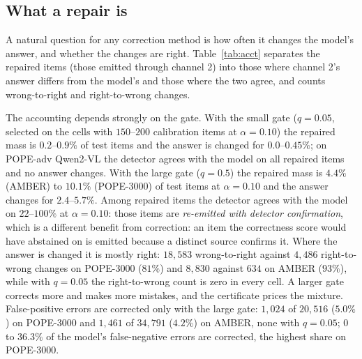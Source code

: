 \subsection{What a repair is}
\label{sec:accounting}

A natural question for any correction method is how often it changes the model's answer, and whether
the changes are right. Table~\ref{tab:acct} separates the repaired items (those emitted through channel 2) into
those where channel 2's answer differs from the model's and those where the two agree, and counts wrong-to-right and
right-to-wrong changes.

\begin{table}[t]
\centering
\caption{Accounting of repaired items, external-gate variant, all items, pooled over test folds of $400$ splits.
``Repaired'' and ``answer changed'' are percentages of test items; the next five columns are percentages of repaired
items. ``FP corrected'' is the number of the model's false-positive errors (it said yes, gold is no) whose emitted answer was
corrected, over the number of such errors; ``FN corrected'' is the share of the model's false-negative errors corrected.}
\label{tab:acct}
\small
\resizebox{\textwidth}{!}{}
\end{table}

The accounting depends strongly on the gate. With the small gate ($q=0.05$, selected on the cells with $150$--$200$ calibration items at
$\alpha=0.10$) the repaired mass is $0.2$--$0.9\%$ of test items and the answer is changed for $0.0$--$0.45\%$; on POPE-adv Qwen2-VL
the detector agrees with the model on all repaired items and no answer changes. With the large gate ($q=0.5$) the repaired mass
is $4.4\%$ (AMBER) to $10.1\%$ (POPE-3000) of test items at $\alpha=0.10$ and the answer changes for $2.4$--$5.7\%$. Among repaired items the
detector agrees with the model on $22$--$100\%$ at $\alpha=0.10$: those items are \emph{re-emitted with detector confirmation},
which is a different benefit from correction: an item the correctness score would have abstained on is emitted
because a distinct source confirms it. Where the answer is changed it is mostly right: $18{,}583$ wrong-to-right against
$4{,}486$ right-to-wrong changes on POPE-3000 ($81\%$) and $8{,}830$ against $634$ on AMBER ($93\%$), while with $q=0.05$ the
right-to-wrong count is zero in every cell. A larger gate corrects more and makes more mistakes, and the certificate prices the mixture.
False-positive errors are corrected only with the large gate: $1{,}024$ of $20{,}516$ ($5.0\%$) on POPE-3000 and $1{,}461$ of $34{,}791$ ($4.2\%$) on
AMBER, none with $q=0.05$; $0$ to $36.3\%$ of the model's false-negative errors are corrected, the highest share on POPE-3000.

